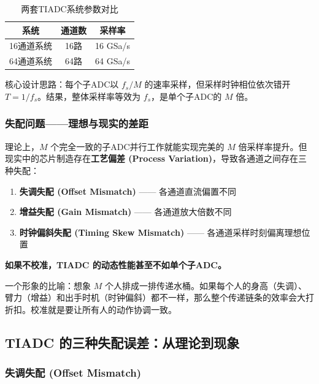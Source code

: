 \documentclass[UTF8,a4paper,11pt]{ctexart}
\begin{document}
\begin{table}[ht]
\centering
\caption{两套TIADC系统参数对比}
\begin{tabular}{ccc}
\toprule
\textbf{系统} & \textbf{通道数} & \textbf{采样率} \\
\midrule
16通道系统 & 16路 & 16 GSa/s \\
64通道系统 & 64路 & 64 GSa/s \\
\bottomrule
\end{tabular}
\end{table}

核心设计思路：每个子ADC以 $f_s/M$ 的速率采样，但采样时钟相位依次错开 $T = 1/f_s$。结果，整体采样率等效为 $f_s$，是单个子ADC的 $M$ 倍。

\subsubsection{失配问题——理想与现实的差距}

理论上，$M$ 个完全一致的子ADC并行工作就能实现完美的 $M$ 倍采样率提升。但现实中的芯片制造存在\textbf{工艺偏差 (Process Variation)}，导致各通道之间存在三种失配：

\begin{enumerate}
    \item \textbf{失调失配 (Offset Mismatch)} —— 各通道直流偏置不同
    \item \textbf{增益失配 (Gain Mismatch)} —— 各通道放大倍数不同
    \item \textbf{时钟偏斜失配 (Timing Skew Mismatch)} —— 各通道采样时刻偏离理想位置
\end{enumerate}

\textbf{如果不校准，TIADC 的动态性能甚至不如单个子ADC。}

一个形象的比喻：想象 $M$ 个人排成一排传递水桶。如果每个人的身高（失调）、臂力（增益）和出手时机（时钟偏斜）都不一样，那么整个传递链条的效率会大打折扣。校准就是要让所有人的动作协调一致。

\subsection{TIADC 的三种失配误差：从理论到现象}
\label{sec:mismatch}

\subsubsection{失调失配 (Offset Mismatch)}
\end{document}
